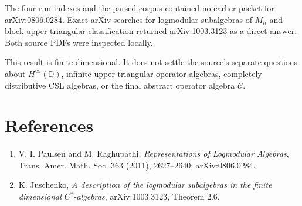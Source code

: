 \documentclass[11pt]{article}
\begin{document}
The four run indexes and the parsed corpus contained no earlier packet for
arXiv:0806.0284.  Exact arXiv searches for logmodular subalgebras of $M_n$ and
block upper-triangular classification returned arXiv:1003.3123 as a direct
answer.  Both source PDFs were inspected locally.

This result is finite-dimensional.  It does not settle the source's separate
questions about $H^\infty(\mathbb D)$, infinite upper-triangular operator
algebras, completely distributive CSL algebras, or the final abstract operator
algebra $\mathcal C$.

\section*{References}
\begin{enumerate}
\item V. I. Paulsen and M. Raghupathi, \emph{Representations of Logmodular
Algebras}, Trans. Amer. Math. Soc. 363 (2011), 2627--2640;
arXiv:0806.0284.
\item K. Juschenko, \emph{A description of the logmodular subalgebras in the
finite dimensional $C^*$-algebras}, arXiv:1003.3123, Theorem 2.6.
\end{enumerate}
\end{document}
